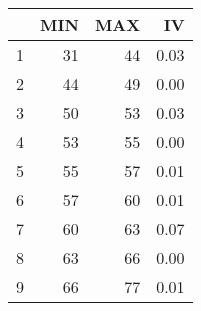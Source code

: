 \begin{table}[ht]
\centering
\begin{tabular}{rrrr}
  \hline
 & MIN & MAX & IV \\ 
  \hline
1 &  31 &  44 & 0.03 \\ 
  2 &  44 &  49 & 0.00 \\ 
  3 &  50 &  53 & 0.03 \\ 
  4 &  53 &  55 & 0.00 \\ 
  5 &  55 &  57 & 0.01 \\ 
  6 &  57 &  60 & 0.01 \\ 
  7 &  60 &  63 & 0.07 \\ 
  8 &  63 &  66 & 0.00 \\ 
  9 &  66 &  77 & 0.01 \\ 
   \hline
\end{tabular}
\end{table}
